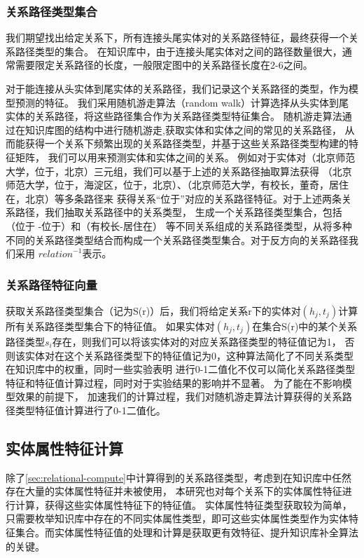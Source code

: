 \subsubsection{关系路径类型集合}
\label{sec:relational-set}
我们期望找出给定关系下，所有连接头尾实体对的关系路径特征，最终获得一个关系路径类型的集合。
在知识库中，由于连接头尾实体对之间的路径数量很大，通常需要限定关系路径的长度，一般限定图中的关系路径长度在2-6之间。

对于能连接从头实体到尾实体的关系路径，我们记录这个关系路径的类型，作为模型预测的特征。
我们采用随机游走算法（random walk）\cite{Lovsz1993RandomWO}计算选择从头实体到尾实体的关系路径，将这些路径集合作为关系路径类型特征集合。
随机游走算法通过在知识库图的结构中进行随机游走,获取实体和实体之间的常见的关系路径，
从而能获得一个关系下频繁出现的关系路径类型，并基于这些关系路径类型构建的特征矩阵，
我们可以用来预测实体和实体之间的关系。
例如对于实体对（北京师范大学，位于，北京）三元组，我们可以基于上述的关系路径抽取算法获得
（北京师范大学，位于，海淀区，位于，北京）、（北京师范大学，有校长，董奇，居住在，北京）等多条路径来
获得关系“位于”对应的关系路径特征。对于上述两条关系路径，我们抽取关系路径中的关系类型，
生成一个关系路径类型集合，包括（位于 -位于）和（有校长-居住在）
等不同关系组成的关系路径类型，从将多种不同的关系路径类型结合而构成一个关系路径类型集合。对于反方向的关系路径我们采用
${relation}^{-1}$表示。

\subsubsection{关系路径特征向量}
获取关系路径类型集合（记为S(r)）后，我们将给定关系r下的实体对$(h_j,t_j)$计算所有关系路径类型集合下的特征值。
如果实体对$(h_j,t_j)$在集合S(r)中的某个关系路径类型$s_i$存在，则我们可以将该实体对的对应关系路径类型的特征值记为1，
否则该实体对在这个关系路径类型下的特征值记为0，这种算法简化了不同关系类型在知识库中的权重，同时一些实验表明\cite{Gardner2014}
进行0-1二值化不仅可以简化关系路径类型特征和特征值计算过程，同时对于实验结果的影响并不显著。
为了能在不影响模型效果的前提下，
加速我们的计算过程，我们对随机游走算法计算获得的关系路径类型特征值计算进行了0-1二值化。

\subsection{实体属性特征计算}
\label{sec:literal-compute}
除了\ref{sec:relational-compute}中计算得到的关系路径类型，考虑到在知识库中任然存在大量的实体属性特征并未被使用，
本研究也对每个关系下的实体属性特征进行计算，获得这些实体属性特征下的特征值。
实体属性特征类型获取较为简单，只需要枚举知识库中存在的不同实体属性类型，即可这些实体属性类型作为实体特征集合。而实体属性特征值的处理和计算是获取更有效特征、提升知识库补全算法的关键。

